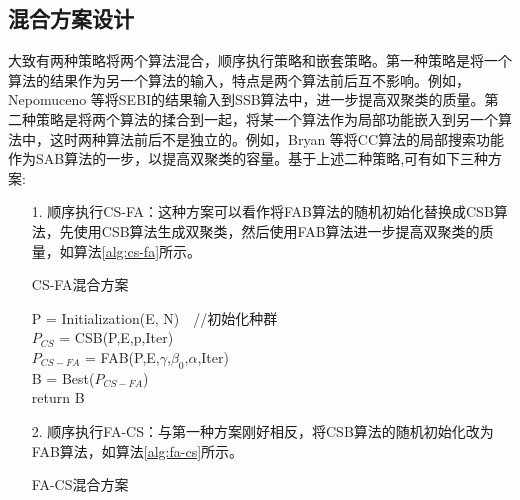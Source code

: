     \subsection{混合方案设计}\label{sec:three}
    大致有两种策略将两个算法混合，顺序执行策略和嵌套策略。第一种策略是将一个算法的结果作为另一个算法的输入，特点是两个算法前后互不影响。例如，Nepomuceno 等将SEBI的结果输入到SSB算法中，进一步提高双聚类的质量。第二种策略是将两个算法的揉合到一起，将某一个算法作为局部功能嵌入到另一个算法中，这时两种算法前后不是独立的。例如，Bryan 等将CC算法的局部搜索功能作为SAB算法的一步，以提高双聚类的容量。基于上述二种策略,可有如下三种方案:
    \begin{enumerate}
       \item[1.] 顺序执行CS-FA：这种方案可以看作将FAB算法的随机初始化替换成CSB算法，先使用CSB算法生成双聚类，然后使用FAB算法进一步提高双聚类的质量，如算法\ref{alg:cs-fa}所示。
        \begin{algorithm}[htbp]
        \caption{CS-FA混合方案} \label{alg:cs-fa}
        P = Initialization(E, N)　//初始化种群 \\
        $P_{CS}$ = CSB(P,E,p,Iter) \\
        $P_{CS-FA}$ = FAB(P,E,$\gamma$,$\beta_0$,$\alpha$,Iter) \\
        B = Best($P_{CS-FA}$) \\
        return B
        \end{algorithm}

       \item[2.] 顺序执行FA-CS：与第一种方案刚好相反，将CSB算法的随机初始化改为FAB算法，如算法\ref{alg:fa-cs}所示。
        \begin{algorithm}[htbp]
        \caption{FA-CS混合方案}\label{alg:fa-cs}


\end{algorithm}
\end{enumerate}
